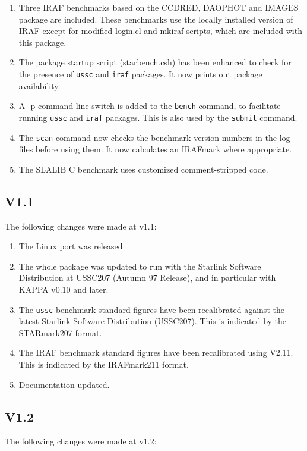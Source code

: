 \begin{enumerate}
\item Three IRAF benchmarks based on the CCDRED, DAOPHOT and IMAGES package
are included. These benchmarks use the locally installed version of IRAF
except for modified login.cl and mkiraf scripts, which are included with
this package.
\item The package startup script (starbench.csh) has been enhanced to check
for the presence of {\tt ussc} and {\tt iraf} packages. It now prints out
package availability.
\item A -p command line switch is added to the {\tt bench} command, to
facilitate running {\tt ussc} and {\tt iraf} packages. This is also used
by the {\tt submit} command.
\item The {\tt scan} command now checks the benchmark version numbers in the
log files before using them. It now calculates an IRAFmark where appropriate.
\item The SLALIB C benchmark uses customized comment-stripped code.
\end{enumerate}

\subsection{V1.1}

The following changes were made at v1.1:

\begin{enumerate}
\item The Linux port was released
\item The whole package was updated to run with the Starlink Software
Distribution at USSC207 (Autumn 97 Release), and in particular with KAPPA
v0.10 and later.
\item The {\tt ussc} benchmark standard figures have been recalibrated
against the latest Starlink Software Distribution (USSC207). This is
indicated by the STARmark207 format.
\item The IRAF benchmark standard figures have been recalibrated using V2.11.
This is indicated by the IRAFmark211 format.
\item Documentation updated.
\end{enumerate}

\subsection{V1.2}

The following changes were made at v1.2:

